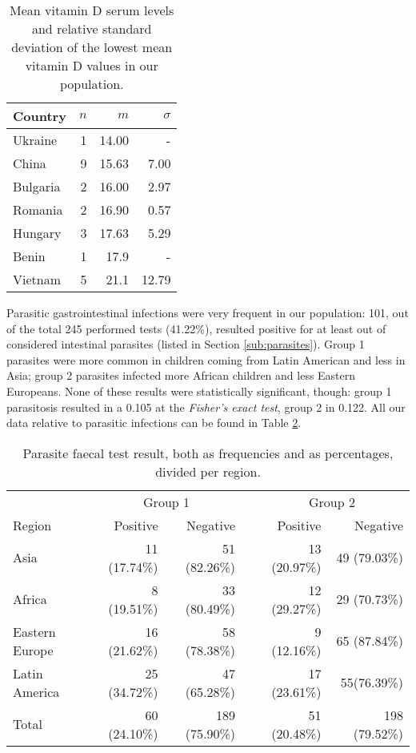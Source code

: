 \begin{table}[H]
   \centering
   \begin{tabular}{l r r r}
      Country\footnotemark[3] & $n$ & $m$ & $\sigma$\\
      \hline
      Ukraine & 1 & 14.00 & -\\
      China & 9 & 15.63 & 7.00\\
      Bulgaria & 2 & 16.00 & 2.97\\
      Romania & 2 & 16.90 & 0.57\\
      Hungary & 3 & 17.63 & 5.29\\
      Benin & 1 & 17.9 & -\\
      Vietnam & 5 & 21.1 & 12.79\\
   \end{tabular}
   \caption{Mean vitamin D serum levels and relative standard deviation of the lowest mean vitamin D values in our population.}
    \label{tab:vitamindpercountry}
\end{table}


Parasitic gastrointestinal infections were very frequent in our population: 101, out of the total 245 performed tests (41.22\%), resulted positive for at least out of considered intestinal parasites (listed in Section \ref{sub:parasites}). Group 1 parasites were more common in children coming from Latin American and less in Asia; group 2 parasites infected more African children and less Eastern Europeans. None of these results were statistically significant, though: group 1 parasitosis resulted in a 0.105 at the \textit{Fisher's exact test}, group 2 in 0.122. All our data relative to parasitic infections can be found in Table \ref{tab:parasitesperregion}.

\begin{table}[H]
   \centering
   \begin{tabular}{l r r c r r}
       & \multicolumn{2}{c}{Group 1} & & \multicolumn{2}{c}{Group 2}\\
       \cline{2-3} \cline{5-6}
      Region\footnotemark[4] & Positive & Negative & & Positive & Negative\\
      \hline
      Asia & 11 (17.74\%) & 51 (82.26\%) & & 13 (20.97\%) & 49 (79.03\%)\\
      Africa & 8 (19.51\%) & 33 (80.49\%) & & 12 (29.27\%) & 29 (70.73\%)\\
      Eastern Europe & 16 (21.62\%) & 58 (78.38\%) & & 9 (12.16\%) & 65 (87.84\%)\\
      Latin America & 25 (34.72\%) & 47 (65.28\%) & & 17 (23.61\%) & 55(76.39\%)\\
      \hline
      Total & 60 (24.10\%) & 189 (75.90\%) & & 51 (20.48\%) & 198 (79.52\%)\\
   \end{tabular}
   \caption{Parasite faecal test result, both as frequencies and as percentages, divided per region.}
    \label{tab:parasitesperregion}
\end{table}

